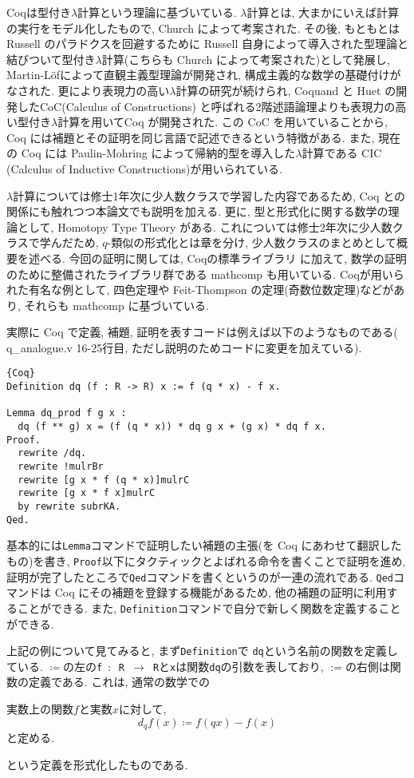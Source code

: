 \documentclass[11pt]{jsreport}
\theoremstyle{mystyle}
\newcommand{\0}{\textbf{0}}
\begin{document}
Coqは型付き$\lambda$計算という理論に基づいている. $\lambda$計算とは, 大まかにいえば計算の実行をモデル化したもので, Church によって考案された. その後, もともとは Russell のパラドクスを回避するために Russell 自身によって導入された型理論と結びついて型付き$\lambda$計算(こちらも Church によって考案された)として発展し, Martin-L\"{o}fによって直観主義型理論が開発され, 構成主義的な数学の基礎付けがなされた. 更により表現力の高い$\lambda$計算の研究が続けられ, Coquand と Huet の開発したCoC(Calculus of Constructions) と呼ばれる2階述語論理よりも表現力の高い型付き$\lambda$計算を用いてCoq が開発された. この CoC を用いていることから, Coq には補題とその証明を同じ言語で記述できるという特徴がある. また, 現在の Coq には Paulin-Mohring によって帰納的型を導入した$\lambda$計算である CIC (Calculus of Inductive Constructions)が用いられている. 

$\lambda$計算については修士1年次に少人数クラスで学習した内容であるため, Coq との関係にも触れつつ本論文でも説明を加える. 更に, 型と形式化に関する数学の理論として, Homotopy Type Theory がある. これについては修士2年次に少人数クラスで学んだため, $q$-類似の形式化とは章を分け, 少人数クラスのまとめとして概要を述べる. 
今回の証明に関しては, Coqの標準ライブラリ \cite{coq sl}に加えて, 数学の証明のために整備されたライブラリ群である mathcomp \cite{coq mc}も用いている. 
Coqが用いられた有名な例として, 四色定理や Feit-Thompson の定理(奇数位数定理)などがあり, それらも mathcomp に基づいている. 

実際に Coq で定義, 補題, 証明を表すコードは例えば以下のようなものである(\cite{coq qana} q\_analogue.v 16-25行目, ただし説明のためコードに変更を加えている).
\begin{lstlisting}{Coq}
Definition dq (f : R -> R) x := f (q * x) - f x.

Lemma dq_prod f g x :
  dq (f ** g) x = (f (q * x)) * dq g x + (g x) * dq f x.
Proof.
  rewrite /dq.
  rewrite !mulrBr 
  rewrite [g x * f (q * x)]mulrC
  rewrite [g x * f x]mulrC
  by rewrite subrKA.
Qed. \end{lstlisting}
基本的には{\tt Lemma}コマンドで証明したい補題の主張(を Coq にあわせて翻訳したもの)を書き, {\tt Proof}以下にタクティックとよばれる命令を書くことで証明を進め, 証明が完了したところで{\tt Qed}コマンドを書くというのが一連の流れである. {\tt Qed}コマンドは Coq にその補題を登録する機能があるため, 他の補題の証明に利用することができる. また, {\tt Definition}コマンドで自分で新しく関数を定義することができる. 

上記の例について見てみると,  
まず{\tt Definition}で {\tt dq}という名前の関数を定義している. {\tt $\coloneqq$}の左の{\tt f $\colon$ R $\to$ R}と{\tt x}は関数{\tt dq}の引数を表しており, $:=$の右側は関数の定義である. 
これは, 通常の数学での
\begin{screen}
実数上の関数$f$と実数$x$に対して, 
\[
  d_q f (x) \coloneqq f(qx) - f(x)
\]
と定める. 
\end{screen}
という定義を形式化したものである. 
\end{document}
